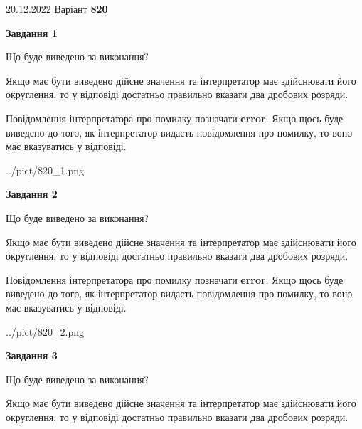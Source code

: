\documentclass[12pt, ukrainian]{article}
\begin{document}
{20.12.2022 Варіант \No \textbf { 820 }\par}
{
\begin {Large}

{\begin {center}\textbf{Завдання 1}\end {center}}\par
Що буде виведено за виконання? \par

Якщо має бути виведено дійсне значення та інтерпретатор має здійснювати його округлення, 
то у відповіді достатньо правильно вказати два дробових розряди.

Повідомлення інтерпретатора про помилку позначати \textbf{error}.
Якщо щось буде виведено до того, як інтерпретатор видасть повідомлення про помилку, 
то воно має вказуватись у відповіді. \par

\begin{center}
	{../pict/820_1.png}
\end{center}
\newpage

{\begin {center}\textbf{Завдання 2}\end {center}}\par
Що буде виведено за виконання? \par

Якщо має бути виведено дійсне значення та інтерпретатор має здійснювати його округлення, 
то у відповіді достатньо правильно вказати два дробових розряди.

Повідомлення інтерпретатора про помилку позначати \textbf{error}.
Якщо щось буде виведено до того, як інтерпретатор видасть повідомлення про помилку, 
то воно має вказуватись у відповіді. \par

\begin{center}
	{../pict/820_2.png}
\end{center}
\newpage

{\begin {center}\textbf{Завдання 3}\end {center}}\par
Що буде виведено за виконання? \par

Якщо має бути виведено дійсне значення та інтерпретатор має здійснювати його округлення, 
то у відповіді достатньо правильно вказати два дробових розряди.


\end{Large}}
\end{document}
